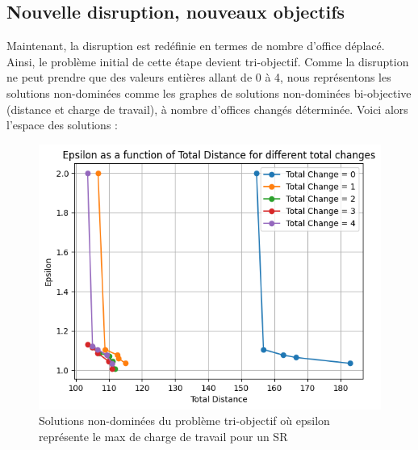 \subsection{Nouvelle disruption, nouveaux objectifs}

Maintenant, la disruption est redéfinie en termes de nombre d'office déplacé. Ainsi, le problème initial de cette étape devient tri-objectif. Comme la disruption ne peut prendre que des valeurs entières allant de 0 à 4, nous représentons les solutions non-dominées comme les graphes de solutions non-dominées bi-objective (distance et charge de travail), à nombre d'offices changés déterminée. Voici alors l'espace des solutions :

\begin{figure}[H]
    \centering
    \includegraphics[width=\textwidth]{Images/step_3/tri-objectif.png}
    \caption{Solutions non-dominées du problème tri-objectif où epsilon représente le max de charge de travail pour un SR}
    \label{fig:nom_de_reference}
\end{figure}
